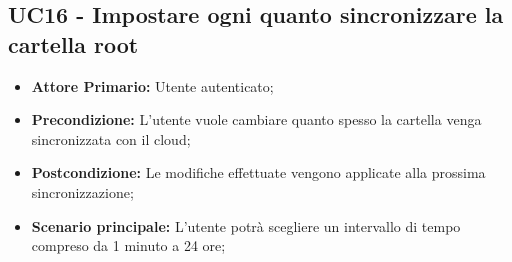 \subsection{UC16 - Impostare ogni quanto sincronizzare la cartella root}
\label{UC16}
\begin{itemize}
\item \textbf{Attore Primario:} Utente autenticato;
\item \textbf{Precondizione:} L'utente vuole cambiare quanto spesso la cartella venga sincronizzata con il cloud;
\item \textbf{Postcondizione:} Le modifiche effettuate vengono applicate alla prossima sincronizzazione;
\item \textbf{Scenario principale:} L'utente potrà scegliere un intervallo di tempo compreso da 1 minuto a 24 ore;
\end{itemize}